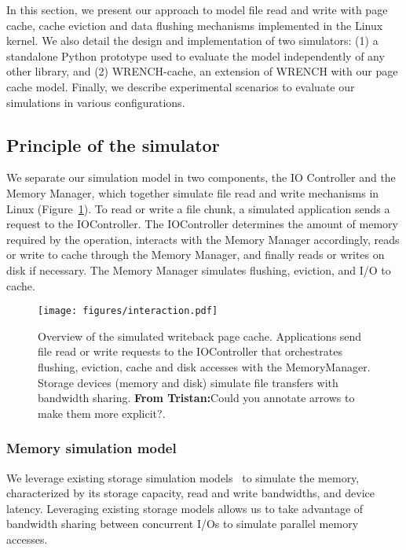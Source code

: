 \documentclass[conference]{IEEEtran}
\newcommand{\tristan}[1]{\color{orange}\textbf{From Tristan:}#1\color{black}}
\begin{document}
		In this section, we present our approach to model file read and write with 
		page cache, cache eviction and data flushing mechanisms implemented 
		in the Linux kernel. We also detail the design and implementation of two simulators:
		(1) a standalone Python prototype used to evaluate the model independently of any other 
		library, and (2) WRENCH-cache, an extension of WRENCH with our page cache model.
		Finally, we describe experimental scenarios to evaluate our simulations in various configurations.

		\subsection{Principle of the simulator}
	
			We separate our simulation model in two components, the IO
			Controller and the Memory Manager, which together simulate 
			file read and write mechanisms in Linux (Figure~\ref{fig:interaction}). 
			To read or write a file chunk, a simulated application sends a request 
			to the IOController. The IOController determines the amount of memory required by the operation,
			interacts with the Memory Manager accordingly, reads or write to cache through the Memory Manager, 
			and finally reads or writes on disk if necessary.
			The Memory Manager simulates flushing, eviction, and I/O to cache.

			\begin{figure}
   				\centering
   				\texttt{[image: figures/interaction.pdf]}
				   \caption{Overview of the simulated writeback page cache.
				   Applications send file read or write requests to the
				   IOController that orchestrates flushing, eviction, cache
				   and disk accesses with the MemoryManager. Storage
				   devices (memory and disk) simulate file transfers with
				   bandwidth sharing. \tristan{Could you annotate arrows to
				   make them more explicit?}.}
				   \label{fig:interaction}
			\end{figure}

			\subsubsection{Memory simulation model}
			
			We leverage existing storage simulation models~\cite{lebre2015} to simulate the memory,
			characterized by its storage capacity, read and write bandwidths,
			and device latency.
			Leveraging existing storage models allows us 
			to take advantage of bandwidth sharing between concurrent I/Os to 
			simulate parallel memory accesses.
\end{document}
